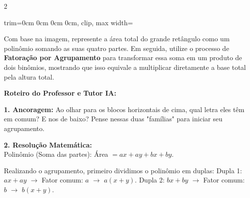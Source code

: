 \begin{multicols*}{2}
\begin{enunciadoLiteral}
\begin{center}
\begin{adjustbox}{trim=0cm 0cm 0cm 0cm, clip, max width=\larguraTikz}
\end{adjustbox}
\end{center}

Com base na imagem, represente a área total do grande retângulo como um polinômio somando as suas quatro partes. Em seguida, utilize o processo de \textbf{Fatoração por Agrupamento} para transformar essa soma em um produto de dois binômios, mostrando que isso equivale a multiplicar diretamente a base total pela altura total.
\end{enunciadoLiteral}

\ifgabarito
    \begin{tcolorbox}[colback=CorTitUm!5, colframe=CorTitUm, boxrule=1pt, arc=4pt, left=6pt, right=6pt, top=6pt, bottom=6pt]
    \small\textbf{\textcolor{CorTitUm}{Roteiro do Professor e Tutor IA:}}\par\vspace{0.1cm}
    \color{CinzaEscuro}
    \textbf{1. Ancoragem:} Ao olhar para os blocos horizontais de cima, qual letra eles têm em comum? E nos de baixo? Pense nessas duas "famílias" para iniciar seu agrupamento.\par\vspace{0.1cm}
    \textbf{2. Resolução Matemática:}\\
    Polinômio (Soma das partes): Área $ = ax + ay + bx + by $.
    
    Realizando o agrupamento, primeiro dividimos o polinômio em duplas:
    Dupla 1: $ ax + ay $ $\rightarrow$ Fator comum: $ a $ $\rightarrow$ $ a(x + y) $.
    Dupla 2: $ bx + by $ $\rightarrow$ Fator comum: $ b $ $\rightarrow$ $ b(x + y) $.
    

\end{tcolorbox}
\end{multicols*}
